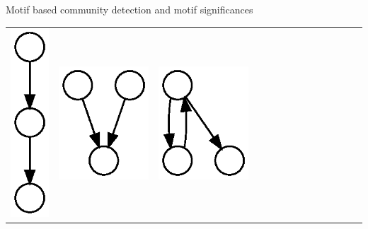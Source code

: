 \documentclass[unknownkeysallowed]{beamer}
\begin{document}
\begin{frame}{Motif based community detection and motif significances}
\begin{tabular}{l|lllllllllllll}
    \includegraphics[height=0.10\textheight]{M9-plain} &
    \includegraphics[height=0.10\textheight]{M10-plain} &
    \includegraphics[height=0.10\textheight]{M11-plain} &

\end{tabular}
\end{frame}
\end{document}
